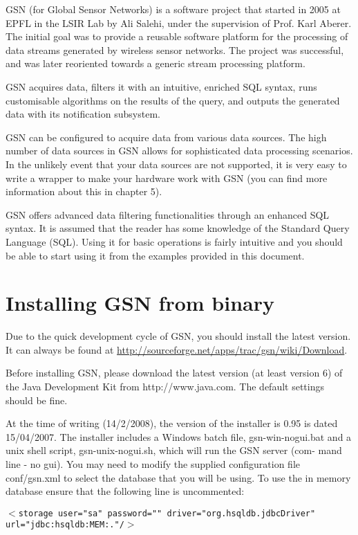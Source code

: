 GSN (for Global Sensor Networks) is a software project that started in
2005 at EPFL in the LSIR Lab by Ali Salehi, under the supervision of
Prof. Karl Aberer. The initial goal was to provide a reusable software
platform for the processing of data streams generated by wireless
sensor networks. The project was successful, and was later reoriented
towards a generic stream processing platform.

GSN acquires data, filters it with an intuitive, enriched SQL syntax,
runs customisable algorithms on the results of the query, and outputs
the generated data with its notification subsystem.

GSN can be configured to acquire data from various data sources. The
high number of data sources in GSN allows for sophisticated data
processing scenarios. In the unlikely event that your data sources are
not supported, it is very easy to write a wrapper to make your hardware
work with GSN (you can find more information about this in chapter 5).

GSN offers advanced data filtering functionalities through an enhanced
SQL syntax. It is assumed that the reader has some knowledge of the
Standard Query Language (SQL). Using it for basic operations is fairly
intuitive and you should be able to start using it from the examples
provided in this document.

\section{Installing GSN from binary}

Due to the quick development cycle of GSN, you should install the
latest version.  It can always be found at
\url{http://sourceforge.net/apps/trac/gsn/wiki/Download}.

Before installing GSN, please download the latest version (at least
version 6) of the Java Development Kit from http://www.java.com. The
default settings should be fine.

At the time of writing (14/2/2008), the version of the installer is
0.95 is dated 15/04/2007. The installer includes a Windows batch file,
gsn-win-nogui.bat and a unix shell script, gsn-unix-nogui.sh, which
will run the GSN server (com- mand line - no gui). You may need to
modify the supplied configuration file conf/gsn.xml to select the
database that you will be using. To use the in memory database ensure
that the following line is uncommented:

\begin{bashcode}[caption={Database configuration in GSN.}, label=listing:bash:dbconfig]
\texttt{\begin{math}<\end{math}storage user="sa" password="" driver="org.hsqldb.jdbcDriver" url="jdbc:hsqldb:MEM:."/\begin{math}>\end{math}}
\end{bashcode}

